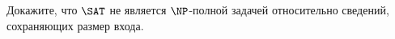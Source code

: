 Докажите, что $\SAT$ не является $\NP$-полной задачей относительно сведений, сохраняющих размер входа.

